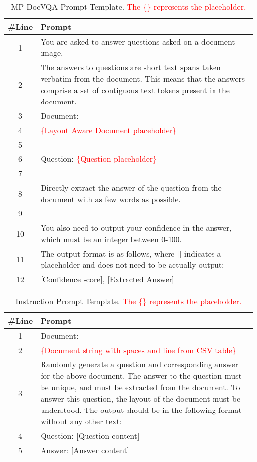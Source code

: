 \documentclass[letterpaper]{article} \usepackage{aaai24_preprint}  \usepackage{times}  \usepackage{helvet}  \usepackage{courier}  \usepackage[hyphens]{url}  \usepackage{graphicx} \urlstyle{rm} \def\UrlFont{\rm}  \usepackage{natbib}  \usepackage{caption} \frenchspacing  \setlength{\pdfpagewidth}{8.5in} \setlength{\pdfpageheight}{11in} \usepackage{algorithm}
\begin{document}
\begin{table*}[ht]
\small
\centering
\begin{tabular}{cl}
\toprule
\#Line& Prompt\\
\midrule
1& You are asked to answer questions asked on a document image.\\
2& \parbox[c]{16cm}{
The answers to questions are short text spans taken verbatim from the document.
This means that the answers comprise a set of contiguous text tokens present in the document.}\\
3& Document:\\
4& \textcolor{red}{\{Layout Aware Document placeholder\}}\\
5& \\
6& Question: \textcolor{red}{\{Question placeholder\}}\\
7& \\
8& Directly extract the answer of the question from the document with as few words as possible.\\
9& \\
10& You also need to output your confidence in the answer, which must be an integer between 0-100. \\
11& \parbox[c]{16cm}{The output format is as follows, where [] indicates a placeholder and does not need to be actually output:}
\\
12& [Confidence score], [Extracted Answer] \\
\bottomrule
\end{tabular}
\caption{MP-DocVQA Prompt Template. \textcolor{red}{The \{\} represents the placeholder.}}
\label{tab:mpdocvqa_prompt}
\end{table*}

\begin{table*}[ht]
\small
\centering
\begin{tabular}{cl}
\toprule
\#Line& Prompt\\
\midrule
1& Document:\\
2& \textcolor{red}{\{Document string with spaces and line from CSV table\}}\\
3& \parbox[c]{16cm}{
Randomly generate a question and corresponding answer for the above document.
The answer to the question must be unique, and must be extracted from the document.
To answer this question, the layout of the document must be understood.
The output should be in the following format without any other text:
}\\
4& Question: [Question content]\\
5& Answer: [Answer content]\\
\bottomrule
\end{tabular}
\caption{Instruction Prompt Template. \textcolor{red}{The \{\} represents the placeholder.}
}
\label{tab:question_prompt}
\end{table*}
\end{document}
